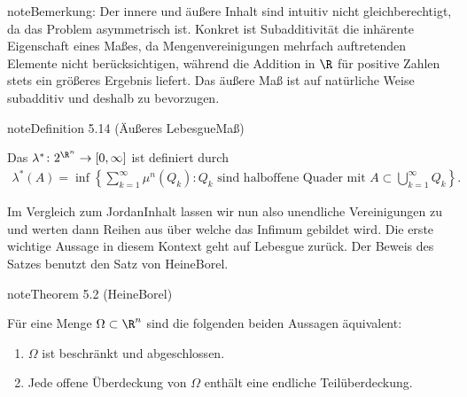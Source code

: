 \documentclass[letterpaper,10pt,german]{jupyterBook}
\begin{document}
\begin{sphinxadmonition}{note}{Bemerkung:}
\sphinxAtStartPar
Der innere und äußere Inhalt sind intuitiv nicht gleichberechtigt, da das Problem asymmetrisch ist. Konkret ist Subadditivität die inhärente Eigenschaft eines Maßes, da Mengenvereinigungen mehrfach auftretenden Elemente nicht berücksichtigen, während die Addition in \(\R\) für positive Zahlen stets ein größeres Ergebnis liefert. Das äußere Maß ist auf natürliche Weise subadditiv und deshalb zu bevorzugen.
\end{sphinxadmonition}
\label{masstheorie/masstheorie:definition-26}
\begin{sphinxadmonition}{note}{Definition 5.14 (Äußeres Lebesgue\sphinxhyphen{}Maß)}



\sphinxAtStartPar
Das  \(\lambda^* \colon 2^{\R^n} \rightarrow [0,\infty]\) ist definiert durch
\begin{equation*}
\begin{split}\lambda^*(A) = \inf \left\{ \sum_{k=1}^\infty \mu^n(Q_k) : Q_k \text{ sind halboffene Quader mit } A \subset \bigcup_{k=1}^\infty Q_k \right\}.\end{split}
\end{equation*}\end{sphinxadmonition}

\sphinxAtStartPar
Im Vergleich zum Jordan\sphinxhyphen{}Inhalt lassen wir nun also unendliche Vereinigungen zu und werten dann Reihen aus über welche das Infimum gebildet wird. Die erste wichtige Aussage in diesem Kontext geht auf Lebesgue zurück. Der Beweis des Satzes benutzt den Satz von Heine\sphinxhyphen{}Borel.
\label{masstheorie/masstheorie:thm:heineborel}
\begin{sphinxadmonition}{note}{Theorem 5.2 (Heine\sphinxhyphen{}Borel)}



\sphinxAtStartPar
Für eine Menge \(\Omega\subset\R^n\) sind die folgenden beiden Aussagen äquivalent:
\begin{enumerate}
%
\item {} 
\sphinxAtStartPar
\(\Omega\) ist beschränkt und abgeschlossen.

\item {} 
\sphinxAtStartPar
Jede offene Überdeckung von \(\Omega\) enthält eine endliche Teilüberdeckung.

\end{enumerate}
\end{sphinxadmonition}
\end{document}
